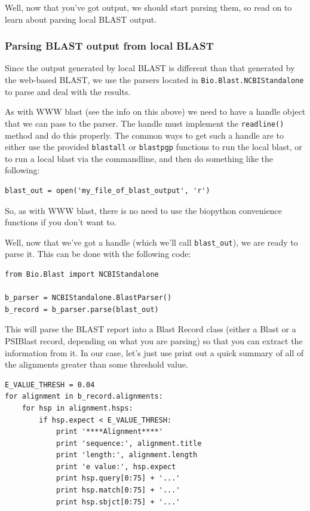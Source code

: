 \documentclass{article}
\begin{document}
Well, now that you've got output, we should start parsing them, so read on to learn about parsing local BLAST output.

\subsubsection{Parsing BLAST output from local BLAST}

Since the output generated by local BLAST is different than that generated by the web-based BLAST, we use the parsers located in \verb|Bio.Blast.NCBIStandalone| to parse and deal with the results.


As with WWW blast (see the info on this above) we need to have a handle object that we can pass to the parser. The handle must implement the \verb|readline()| method and do this properly. The common ways to get such a handle are to either use the provided \verb|blastall| or \verb|blastpgp| functions to run the local blast, or to run a local blast via the commandline, and then do something like the following:

\begin{verbatim}
blast_out = open('my_file_of_blast_output', 'r')
\end{verbatim}

So, as with WWW blast, there is no need to use the biopython convenience functions if you don't want to.


Well, now that we've got a handle (which we'll call \verb|blast_out|), we are ready to parse it. This can be done with the following code:

\begin{verbatim}
from Bio.Blast import NCBIStandalone

b_parser = NCBIStandalone.BlastParser()
b_record = b_parser.parse(blast_out)
\end{verbatim} 

This will parse the BLAST report into a Blast Record class (either a Blast or a PSIBlast record, depending on what you are parsing) so that you can extract the information from it. In our case, let's just use print out a quick summary of all of the alignments greater than some threshold value.

\begin{verbatim}
E_VALUE_THRESH = 0.04
for alignment in b_record.alignments:
    for hsp in alignment.hsps:
        if hsp.expect < E_VALUE_THRESH:
            print '****Alignment****'
            print 'sequence:', alignment.title
            print 'length:', alignment.length
            print 'e value:', hsp.expect
            print hsp.query[0:75] + '...'
            print hsp.match[0:75] + '...'
            print hsp.sbjct[0:75] + '...'
\end{verbatim}
\end{document}
